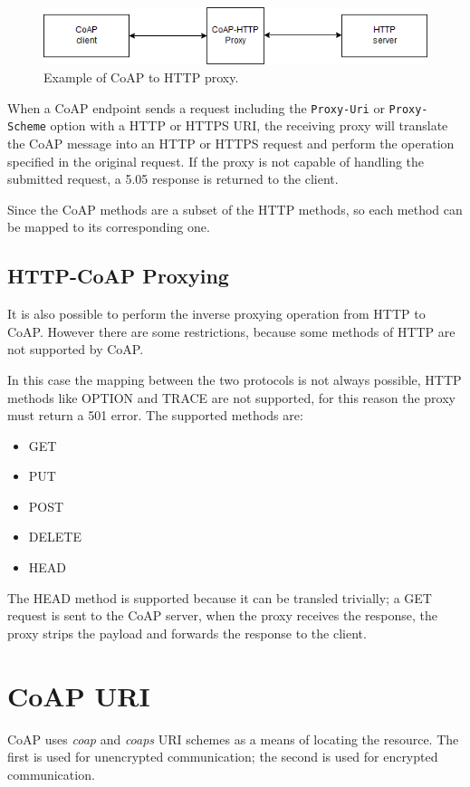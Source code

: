 	\begin{figure}
		\includegraphics[width=\linewidth]{coap-img1.png}
		\caption{Example of CoAP to HTTP proxy.}
		\label{fig:coap2}
	\end{figure}
	
	When a CoAP endpoint sends a request including the \texttt{Proxy-Uri} or \texttt{Proxy-Scheme} option with a HTTP or HTTPS URI, the receiving proxy will translate the CoAP message into an HTTP or HTTPS request and perform the operation specified in the original request.\newline
	If the proxy is not capable of handling the submitted request, a 5.05 response is returned to the client.\newline

	Since the CoAP methods are a subset of the HTTP methods, so each method can be mapped to its corresponding one.

	
	\subsection{HTTP-CoAP Proxying}
	It is also possible to perform the inverse proxying operation from HTTP to CoAP.\newline
	However there are some restrictions, because some methods of HTTP are not supported by CoAP.
	
	In this case the mapping between the two protocols is not always possible, HTTP methods like
	OPTION and TRACE are not supported, for this reason the proxy must return a 501 error.\newline
	The supported methods are:
	\begin{itemize}
		\item GET
		\item PUT
		\item POST
		\item DELETE
		\item HEAD
	\end{itemize}
	
	The HEAD method is supported because it can be transled trivially; a GET request is sent to the CoAP server,
	when the proxy receives the response, the proxy strips the payload and forwards the response to the client.
	
	\section{CoAP URI}\label{sc:coap_uri}
	CoAP uses \emph{coap} and \emph{coaps} URI schemes as a means of locating the resource.
	The first is used for unencrypted communication; the second is used for encrypted communication.
	
